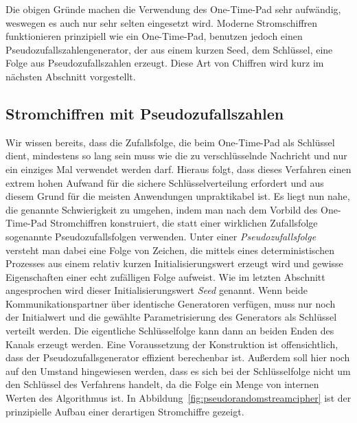 Die obigen Gründe machen die Verwendung des One-Time-Pad sehr aufwändig, weswegen es auch nur sehr selten eingesetzt wird. Moderne Stromschiffren funktionieren
prinzipiell wie ein One-Time-Pad, benutzen jedoch einen Pseudozufallszahlengenerator, der aus einem kurzen Seed, dem Schlüssel, eine Folge aus
Pseudozufallszahlen erzeugt. Diese Art von Chiffren wird kurz im nächsten Abschnitt vorgestellt.

\subsection{Stromchiffren mit Pseudozufallszahlen}
\label{pseudorandomstreamcipher}

Wir wissen bereits, dass die Zufallsfolge, die beim One-Time-Pad als Schlüssel dient,
 mindestens so lang sein muss wie die zu verschlüsselnde Nachricht und nur ein einziges Mal verwendet werden darf. Hieraus folgt, dass dieses Verfahren einen
 extrem hohen Aufwand für die sichere Schlüsselverteilung erfordert und aus diesem Grund für die meisten Anwendungen unpraktikabel ist. Es liegt nun nahe, die
 genannte Schwierigkeit zu umgehen, indem man nach dem Vorbild des One-Time-Pad Stromchiffren konstruiert, die statt einer wirklichen Zufallsfolge sogenannte
 Pseudozufallsfolgen verwenden. Unter einer \emph{Pseudozufallsfolge} versteht man dabei eine Folge von Zeichen, die mittels eines deterministischen Prozesses
 aus einem relativ kurzen Initialisierungswert erzeugt wird und gewisse Eigenschaften einer echt zufälligen Folge aufweist. Wie im letzten Abschnitt
 angesprochen wird dieser Initialisierungswert \emph{Seed} genannt. Wenn beide Kommunikationspartner über identische Generatoren verfügen, muss nur noch der
 Initialwert und die gewählte Parametrisierung des Generators als Schlüssel verteilt werden. Die eigentliche Schlüsselfolge kann dann an beiden Enden des
 Kanals erzeugt werden. Eine Voraussetzung der Konstruktion ist offensichtlich, dass der Pseudozufallsgenerator effizient berechenbar ist. Außerdem soll hier
 noch auf den Umstand hingewiesen werden, dass es sich bei der Schlüsselfolge nicht um den Schlüssel des Verfahrens handelt, da die Folge ein Menge von internen
 Werten des Algorithmus ist. In Abbildung~\ref{fig:pseudorandomstreamcipher} ist der prinzipielle Aufbau einer derartigen Stromchiffre gezeigt.

